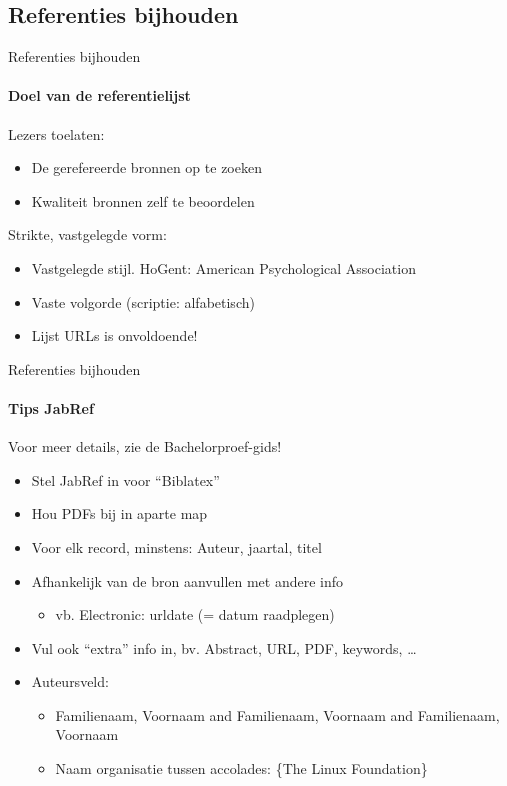 \subsection{Referenties bijhouden}
\begin{frame}{Referenties bijhouden}
\framesubtitle{Doel van de referentielijst}

Lezers toelaten:

\begin{itemize}
  \item De gerefereerde bronnen op te zoeken
  \item Kwaliteit bronnen zelf te beoordelen
\end{itemize}

\pause

Strikte, vastgelegde vorm:

\begin{itemize}
  \item Vastgelegde stijl. HoGent: American Psychological Association
  \item Vaste volgorde (scriptie: alfabetisch)
  \item Lijst URLs is onvoldoende!
\end{itemize}

\pause

\end{frame}

\begin{frame}{Referenties bijhouden}
  \framesubtitle{Tips JabRef}
  
  Voor meer details, zie de Bachelorproef-gids!
  
  \begin{itemize}
    \item Stel JabRef in voor ``Biblatex''
    \item Hou PDFs bij in aparte map
    \item Voor elk record, minstens: Auteur, \alert{jaartal}, titel
    \item Afhankelijk van de bron aanvullen met andere info
    \begin{itemize}
      \item vb. Electronic: urldate (= datum raadplegen)
    \end{itemize}
    \item Vul ook ``extra'' info in, bv. Abstract, URL, PDF, keywords, \ldots
    \item Auteursveld: 
    \begin{itemize}
      \item Familienaam, Voornaam \alert{and} Familienaam, Voornaam \alert{and} Familienaam, Voornaam
      \item Naam organisatie tussen accolades: \{The Linux Foundation\}
    \end{itemize}
  \end{itemize}
  
\end{frame}
